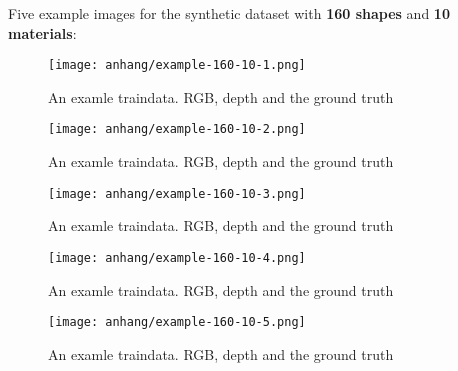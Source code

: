 	\FloatBarrier
	\clearpage
	Five example images for the synthetic dataset with \textbf{160 shapes} and \textbf{10 materials}:
	\begin{figure}[H]
		\centering
		\texttt{[image: anhang/example-160-10-1.png]}
		\caption[An examle traindata. RGB, depth and the ground truth]{An examle traindata. RGB, depth and the ground truth}
	\end{figure}
	\begin{figure}[H]
		\centering
		\texttt{[image: anhang/example-160-10-2.png]}
		\caption[An examle traindata. RGB, depth and the ground truth]{An examle traindata. RGB, depth and the ground truth}
	\end{figure}
	\begin{figure}[H]
		\centering
		\texttt{[image: anhang/example-160-10-3.png]}
		\caption[An examle traindata. RGB, depth and the ground truth]{An examle traindata. RGB, depth and the ground truth}
	\end{figure}
	\begin{figure}[H]
		\centering
		\texttt{[image: anhang/example-160-10-4.png]}
		\caption[An examle traindata. RGB, depth and the ground truth]{An examle traindata. RGB, depth and the ground truth}
	\end{figure}
	\begin{figure}[H]
		\centering
		\texttt{[image: anhang/example-160-10-5.png]}
		\caption[An examle traindata. RGB, depth and the ground truth]{An examle traindata. RGB, depth and the ground truth}
	\end{figure}
	
